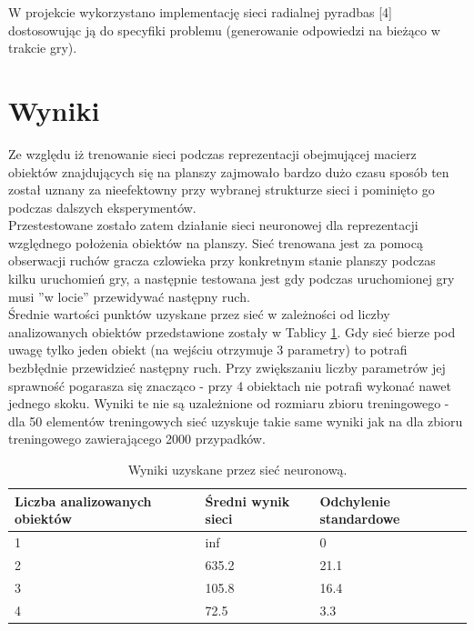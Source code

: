 \documentclass[11pt]{article} %
\begin{document}
W projekcie wykorzystano implementację sieci radialnej pyradbas [4] dostosowując ją do specyfiki problemu (generowanie odpowiedzi na bieżąco w trakcie gry). \\

\section{Wyniki}

Ze względu iż trenowanie sieci podczas reprezentacji obejmującej macierz obiektów znajdujących się na planszy zajmowało bardzo dużo czasu sposób ten został uznany za nieefektowny przy wybranej strukturze sieci i pominięto go podczas dalszych eksperymentów. \\


Przestestowane zostało zatem działanie sieci neuronowej dla reprezentacji względnego położenia obiektów na planszy. Sieć trenowana jest za pomocą obserwacji ruchów gracza czlowieka przy konkretnym stanie planszy podczas kilku uruchomień gry, a następnie testowana jest gdy podczas uruchomionej gry musi ''w locie'' przewidywać następny ruch. \\


Średnie wartości punktów uzyskane przez sieć w zależności od liczby analizowanych obiektów przedstawione zostały w Tablicy \ref{tab:results}. Gdy sieć bierze pod uwagę tylko jeden obiekt (na wejściu otrzymuje 3 parametry) to potrafi bezbłędnie przewidzieć następny ruch. Przy zwiększaniu liczby parametrów jej sprawność pogarasza się znacząco - przy 4 obiektach nie potrafi wykonać nawet jednego skoku. Wyniki te nie są uzależnione od rozmiaru zbioru treningowego - dla 50 elementów treningowych sieć uzyskuje takie same wyniki jak na dla zbioru treningowego zawierającego 2000 przypadków. \\


\begin{table}[]
\centering
\caption{Wyniki uzyskane przez sieć neuronową.}
\label{tab:results}
\begin{tabular}{|l|l|l|}
\hline
{\bf Liczba analizowanych obiektów} & {\bf Średni wynik sieci} & {\bf Odchylenie standardowe} \\ \hline
1                                   & inf                      & 0                            \\ \hline
2                                   & 635.2                    & 21.1                         \\ \hline
3                                   & 105.8                    & 16.4                         \\ \hline
4                                   & 72.5                     & 3.3                          \\ \hline
\end{tabular}
\end{table}
\end{document}

